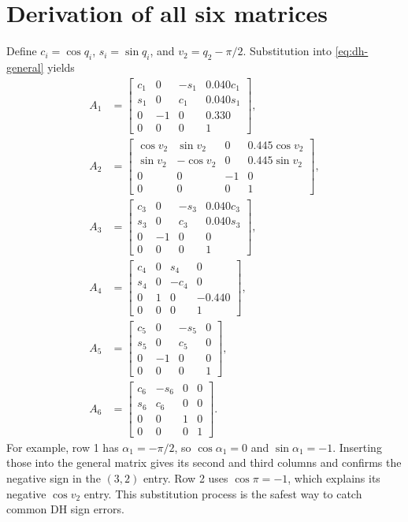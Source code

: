 \section{Derivation of all six matrices}
Define $c_i=\cos q_i$, $s_i=\sin q_i$, and
$v_2=q_2-\pi/2$. Substitution into \cref{eq:dh-general} yields
\begin{align}
A_1&=\begin{bmatrix}
c_1&0&-s_1&0.040c_1\\s_1&0&c_1&0.040s_1\\0&-1&0&0.330\\0&0&0&1
\end{bmatrix},\\[1mm]
A_2&=\begin{bmatrix}
\cos v_2&\sin v_2&0&0.445\cos v_2\\
\sin v_2&-\cos v_2&0&0.445\sin v_2\\
0&0&-1&0\\0&0&0&1
\end{bmatrix},\\[1mm]
A_3&=\begin{bmatrix}
c_3&0&-s_3&0.040c_3\\s_3&0&c_3&0.040s_3\\0&-1&0&0\\0&0&0&1
\end{bmatrix},\\[1mm]
A_4&=\begin{bmatrix}
c_4&0&s_4&0\\s_4&0&-c_4&0\\0&1&0&-0.440\\0&0&0&1
\end{bmatrix},\\[1mm]
A_5&=\begin{bmatrix}
c_5&0&-s_5&0\\s_5&0&c_5&0\\0&-1&0&0\\0&0&0&1
\end{bmatrix},\\[1mm]
A_6&=\begin{bmatrix}
c_6&-s_6&0&0\\s_6&c_6&0&0\\0&0&1&0\\0&0&0&1
\end{bmatrix}.
\label{eq:all-dh-matrices}
\end{align}
For example, row 1 has $\alpha_1=-\pi/2$, so
$\cos\alpha_1=0$ and $\sin\alpha_1=-1$. Inserting those into the general
matrix gives its second and third columns and confirms the negative sign in
the $(3,2)$ entry. Row 2 uses $\cos\pi=-1$, which explains its negative
$\cos v_2$ entry. This substitution process is the safest way to catch common
DH sign errors.

